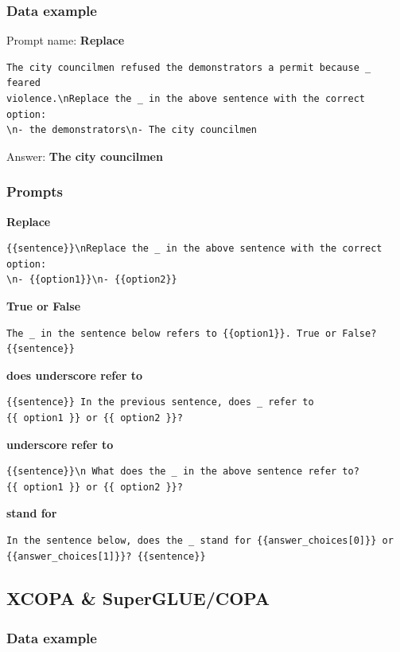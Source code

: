 \documentclass[twoside,11pt]{article}
\begin{document}
\subsubsection{Data example}

Prompt name: \textbf{Replace}
\begin{verbatim}
The city councilmen refused the demonstrators a permit because _ feared 
violence.\nReplace the _ in the above sentence with the correct option: 
\n- the demonstrators\n- The city councilmen
\end{verbatim}
Answer: \textbf{The city councilmen}

\subsubsection{Prompts}

\textbf{Replace}
\begin{verbatim}
{{sentence}}\nReplace the _ in the above sentence with the correct option:
\n- {{option1}}\n- {{option2}}
\end{verbatim}

\noindent\textbf{True or False}
\begin{verbatim}
The _ in the sentence below refers to {{option1}}. True or False? 
{{sentence}}
\end{verbatim}

\noindent\textbf{does underscore refer to}
\begin{verbatim}
{{sentence}} In the previous sentence, does _ refer to 
{{ option1 }} or {{ option2 }}?
\end{verbatim}

\noindent\textbf{underscore refer to}
\begin{verbatim}
{{sentence}}\n What does the _ in the above sentence refer to? 
{{ option1 }} or {{ option2 }}?
\end{verbatim}

\noindent\textbf{stand for}
\begin{verbatim}
In the sentence below, does the _ stand for {{answer_choices[0]}} or 
{{answer_choices[1]}}? {{sentence}}
\end{verbatim}


\subsection{XCOPA \& SuperGLUE/COPA}

\subsubsection{Data example}
\end{document}
